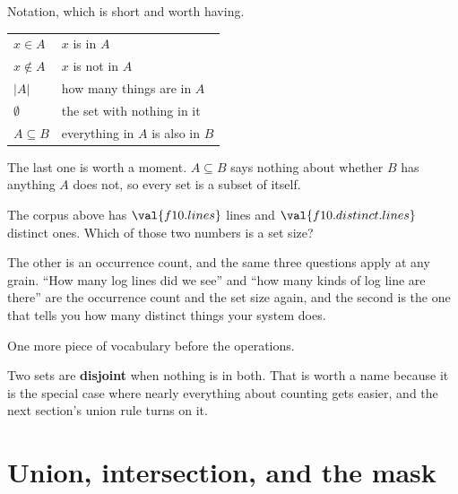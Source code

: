 \begin{fr}
Notation, which is short and worth having.

\begin{center}
\begin{tabular}{ll}
\toprule
$x \in A$ & $x$ is in $A$ \\
$x \notin A$ & $x$ is not in $A$ \\
$\lvert A \rvert$ & how many things are in $A$ \\
$\emptyset$ & the set with nothing in it \\
$A \subseteq B$ & everything in $A$ is also in $B$ \\
\bottomrule
\end{tabular}
\end{center}

The last one is worth a moment. $A \subseteq B$ says nothing about whether $B$
has anything $A$ does not, so every set is a subset of itself.

The corpus above has $\val{f10.lines}$ lines and $\val{f10.distinct.lines}$
distinct ones. Which of those two numbers is a set size?
\nextframe
\end{fr}

\begin{fr}
The other is an occurrence count, and the same three questions apply at any
grain. \enquote{How many log lines
did we see} and \enquote{how many kinds of log line are there} are the
occurrence count and the set size again, and the second is the one that tells
you how many distinct things your system does.
\end{fr}

\begin{fr}
One more piece of vocabulary before the operations.

Two sets are \textbf{disjoint} when nothing is in both. That is worth a name
because it is the special case where nearly everything about counting gets
easier, and the next section's union rule turns on it.
\end{fr}

\section{Union, intersection, and the mask}
\label{sec:F10-operations}

